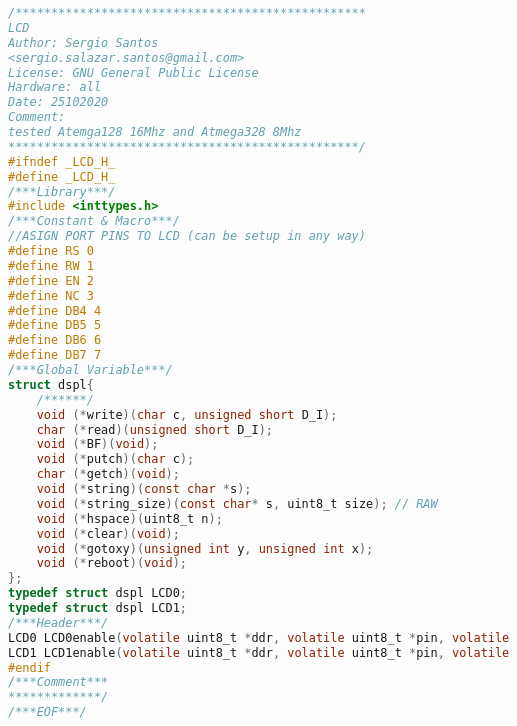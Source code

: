\begin{lstlisting}[language=C, caption={lcd.h}, label=lcd-h, captionpos=b]
/*************************************************
LCD
Author: Sergio Santos 
<sergio.salazar.santos@gmail.com>
License: GNU General Public License
Hardware: all
Date: 25102020
Comment:
tested Atemga128 16Mhz and Atmega328 8Mhz
*************************************************/
#ifndef _LCD_H_
#define _LCD_H_
/***Library***/
#include <inttypes.h>
/***Constant & Macro***/
//ASIGN PORT PINS TO LCD (can be setup in any way)
#define RS 0
#define RW 1
#define EN 2
#define NC 3
#define DB4 4
#define DB5 5
#define DB6 6
#define DB7 7
/***Global Variable***/
struct dspl{
	/******/
	void (*write)(char c, unsigned short D_I);
	char (*read)(unsigned short D_I);
	void (*BF)(void);
	void (*putch)(char c);
	char (*getch)(void);
	void (*string)(const char *s);
	void (*string_size)(const char* s, uint8_t size); // RAW
	void (*hspace)(uint8_t n);
	void (*clear)(void);
	void (*gotoxy)(unsigned int y, unsigned int x);
	void (*reboot)(void);
};
typedef struct dspl LCD0;
typedef struct dspl LCD1;
/***Header***/
LCD0 LCD0enable(volatile uint8_t *ddr, volatile uint8_t *pin, volatile uint8_t *port);
LCD1 LCD1enable(volatile uint8_t *ddr, volatile uint8_t *pin, volatile uint8_t *port);
#endif
/***Comment***
*************/
/***EOF***/
\end{lstlisting}
